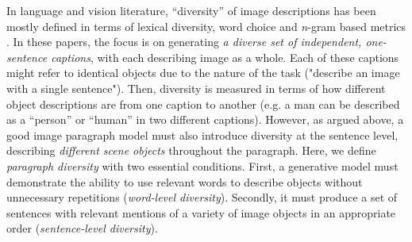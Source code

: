 \documentclass[11pt,a4paper]{article}
\begin{document}


In language and vision literature, ``diversity'' of image descriptions has been mostly defined in terms of lexical diversity, word choice and \textit{n}-gram based metrics \cite{Devlin2015, Vijayakumar2016, Lindh2018, VanMiltenburg2018}.
In these papers, the focus is on generating \textit{a diverse set of independent, one-sentence captions}, with each describing image as a whole.
Each of these captions might refer to identical objects due to the nature of the task ("describe an image with a single sentence").
Then, diversity is measured in terms of how different object descriptions are from one caption to another (e.g. a man can be described as a ``person'' or ``human'' in two different captions).
However, as argued above, a good image paragraph model must also introduce diversity at the sentence level, describing \textit{different scene objects} throughout the paragraph. %
Here, we define \textit{paragraph diversity} with two essential conditions.
First, a generative model must demonstrate the ability to use %
relevant words to describe objects without unnecessary repetitions (\emph{word-level diversity}).
Secondly, it must produce a set of sentences with relevant mentions of a variety of image objects in an appropriate order (\emph{sentence-level diversity}).

\end{document}
